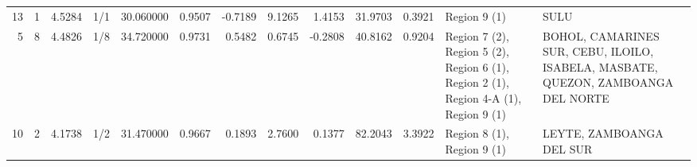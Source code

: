 \begin{tabular}{rrrlrrrrrrrll}
13 & 1 & {\cellcolor[HTML]{779AF7}} \color[HTML]{F1F1F1} 4.5284 & 1/1 & {\cellcolor[HTML]{E6D7CF}} \color[HTML]{000000} 30.060000 & 0.9507 & -0.7189 & 9.1265 & 1.4153 & 31.9703 & 0.3921 & Region 9 (1) & SULU \\
5 & 8 & {\cellcolor[HTML]{6F92F3}} \color[HTML]{F1F1F1} 4.4826 & 1/8 & {\cellcolor[HTML]{F7AA8C}} \color[HTML]{000000} 34.720000 & 0.9731 & 0.5482 & 0.6745 & -0.2808 & 40.8162 & 0.9204 & Region 7 (2), Region 5 (2), Region 6 (1), Region 2 (1), Region 4-A (1), Region 9 (1) & BOHOL, CAMARINES SUR, CEBU, ILOILO, ISABELA, MASBATE, QUEZON, ZAMBOANGA DEL NORTE \\
10 & 2 & {\cellcolor[HTML]{3B4CC0}} \color[HTML]{F1F1F1} 4.1738 & 1/2 & {\cellcolor[HTML]{F0CDBB}} \color[HTML]{000000} 31.470000 & 0.9667 & 0.1893 & 2.7600 & 0.1377 & 82.2043 & 3.3922 & Region 8 (1), Region 9 (1) & LEYTE, ZAMBOANGA DEL SUR \\
\bottomrule
\end{tabular}
